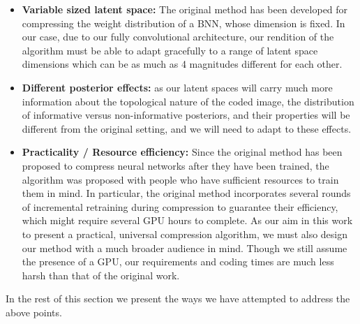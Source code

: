 \documentclass{article}
\begin{document}
\begin{itemize}
\item \textbf{Variable sized latent space:} The original method has been
  developed for compressing the weight distribution of a BNN, whose dimension is
  fixed. In our case, due to our fully convolutional architecture, our rendition
  of the algorithm must be able to adapt gracefully to a range of latent space
  dimensions which can be as much as 4 magnitudes different for each other.

\item \textbf{Different posterior effects:} as our latent spaces will carry much
  more information about the topological nature of the coded image, the
  distribution of informative versus non-informative posteriors, and their
  properties will be different from the original setting, and we will need to
  adapt to these effects.

\item \textbf{Practicality / Resource efficiency:} Since the original method has
  been proposed to compress neural networks after they have been trained, the
  algorithm was proposed with people who have sufficient resources to train them
  in mind. In particular, the original method incorporates several rounds of
  incremental retraining during compression to guarantee their efficiency, which
  might require several GPU hours to complete. As our aim in this work to
  present a practical, universal compression algorithm, we must also design our
  method with a much broader audience in mind. Though we still assume the
  presence of a GPU, our requirements and coding times are much less harsh than
  that of the original work.
\end{itemize}

In the rest of this section we present the ways we have attempted to address the
above points.
\end{document}
